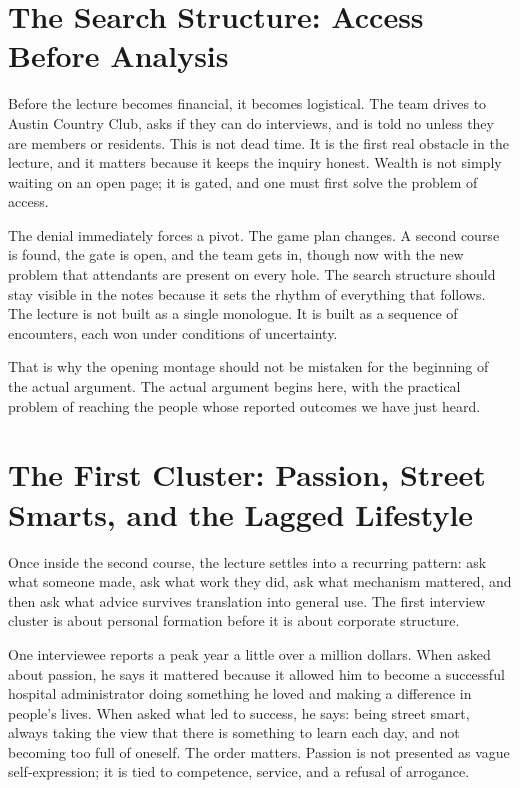 \section{The Search Structure: Access Before Analysis}

Before the lecture becomes financial, it becomes logistical. The team drives to Austin Country Club, asks if they can do interviews, and is told no unless they are members or residents. This is not dead time. It is the first real obstacle in the lecture, and it matters because it keeps the inquiry honest. Wealth is not simply waiting on an open page; it is gated, and one must first solve the problem of access.

The denial immediately forces a pivot. The game plan changes. A second course is found, the gate is open, and the team gets in, though now with the new problem that attendants are present on every hole. The search structure should stay visible in the notes because it sets the rhythm of everything that follows. The lecture is not built as a single monologue. It is built as a sequence of encounters, each won under conditions of uncertainty.

That is why the opening montage should not be mistaken for the beginning of the actual argument. The actual argument begins here, with the practical problem of reaching the people whose reported outcomes we have just heard.

\section{The First Cluster: Passion, Street Smarts, and the Lagged Lifestyle}

Once inside the second course, the lecture settles into a recurring pattern: ask what someone made, ask what work they did, ask what mechanism mattered, and then ask what advice survives translation into general use. The first interview cluster is about personal formation before it is about corporate structure.

One interviewee reports a peak year a little over a million dollars. When asked about passion, he says it mattered because it allowed him to become a successful hospital administrator doing something he loved and making a difference in people's lives. When asked what led to success, he says: being street smart, always taking the view that there is something to learn each day, and not becoming too full of oneself. The order matters. Passion is not presented as vague self-expression; it is tied to competence, service, and a refusal of arrogance.

